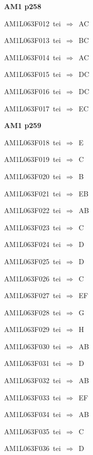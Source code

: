 \par\vfill\eject
{\bf\hfill AM1 p258\hfill\hbox{}}\par\bigskip
{\sixrm AM1L063F012\ {\sixit tei}\ }$\Rightarrow$\ AC\par\smallskip
{\sixrm AM1L063F013\ {\sixit tei}\ }$\Rightarrow$\ BC\par\smallskip
{\sixrm AM1L063F014\ {\sixit tei}\ }$\Rightarrow$\ AC\par\smallskip
{\sixrm AM1L063F015\ {\sixit tei}\ }$\Rightarrow$\ DC\par\smallskip
{\sixrm AM1L063F016\ {\sixit tei}\ }$\Rightarrow$\ DC\par\smallskip
{\sixrm AM1L063F017\ {\sixit tei}\ }$\Rightarrow$\ EC\par\smallskip

\par\vfill\eject
{\bf\hfill AM1 p259\hfill\hbox{}}\par\bigskip
{\sixrm AM1L063F018\ {\sixit tei}\ }$\Rightarrow$\ E\par\smallskip
{\sixrm AM1L063F019\ {\sixit tei}\ }$\Rightarrow$\ C\par\smallskip
{\sixrm AM1L063F020\ {\sixit tei}\ }$\Rightarrow$\ B\par\smallskip
{\sixrm AM1L063F021\ {\sixit tei}\ }$\Rightarrow$\ EB\par\smallskip
{\sixrm AM1L063F022\ {\sixit tei}\ }$\Rightarrow$\ AB\par\smallskip
{\sixrm AM1L063F023\ {\sixit tei}\ }$\Rightarrow$\ C\par\smallskip
{\sixrm AM1L063F024\ {\sixit tei}\ }$\Rightarrow$\ D\par\smallskip
{\sixrm AM1L063F025\ {\sixit tei}\ }$\Rightarrow$\ D\par\smallskip
{\sixrm AM1L063F026\ {\sixit tei}\ }$\Rightarrow$\ C\par\smallskip
{\sixrm AM1L063F027\ {\sixit tei}\ }$\Rightarrow$\ EF\par\smallskip
{\sixrm AM1L063F028\ {\sixit tei}\ }$\Rightarrow$\ G\par\smallskip
{\sixrm AM1L063F029\ {\sixit tei}\ }$\Rightarrow$\ H\par\smallskip
{\sixrm AM1L063F030\ {\sixit tei}\ }$\Rightarrow$\ AB\par\smallskip
{\sixrm AM1L063F031\ {\sixit tei}\ }$\Rightarrow$\ D\par\smallskip
{\sixrm AM1L063F032\ {\sixit tei}\ }$\Rightarrow$\ AB\par\smallskip
{\sixrm AM1L063F033\ {\sixit tei}\ }$\Rightarrow$\ EF\par\smallskip
{\sixrm AM1L063F034\ {\sixit tei}\ }$\Rightarrow$\ AB\par\smallskip
{\sixrm AM1L063F035\ {\sixit tei}\ }$\Rightarrow$\ C\par\smallskip
{\sixrm AM1L063F036\ {\sixit tei}\ }$\Rightarrow$\ D\par\smallskip

